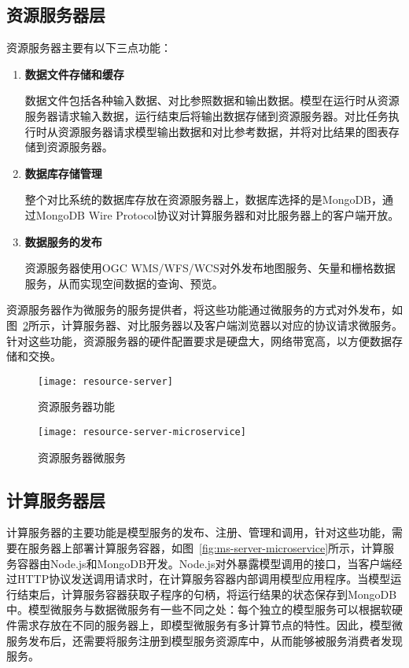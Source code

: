 \subsection{资源服务器层}
资源服务器主要有以下三点功能：
\begin{enumerate}[(1)]
\item \textbf{数据文件存储和缓存}

数据文件包括各种输入数据、对比参照数据和输出数据。模型在运行时从资源服务器请求输入数据，运行结束后将输出数据存储到资源服务器。对比任务执行时从资源服务器请求模型输出数据和对比参考数据，并将对比结果的图表存储到资源服务器。

\item \textbf{数据库存储管理}

整个对比系统的数据库存放在资源服务器上，数据库选择的是MongoDB，通过MongoDB Wire Protocol协议对计算服务器和对比服务器上的客户端开放。

\item \textbf{数据服务的发布}

资源服务器使用OGC WMS/WFS/WCS对外发布地图服务、矢量和栅格数据服务，从而实现空间数据的查询、预览。

\end{enumerate}

资源服务器作为微服务的服务提供者，将这些功能通过微服务的方式对外发布，如图~\ref{fig:resource-server-microservice}所示，计算服务器、对比服务器以及客户端浏览器以对应的协议请求微服务。针对这些功能，资源服务器的硬件配置要求是硬盘大，网络带宽高，以方便数据存储和交换。

\begin{figure}[!htbp]
    \centering
    \texttt{[image: resource-server]}
    \caption{资源服务器功能}
    \label{fig:resource-server}
\end{figure}

\begin{figure}[!htbp]
    \centering
    \texttt{[image: resource-server-microservice]}
    \caption{资源服务器微服务}
    \label{fig:resource-server-microservice}
\end{figure}


\subsection{计算服务器层}
计算服务器的主要功能是模型服务的发布、注册、管理和调用，针对这些功能，需要在服务器上部署计算服务容器，如图~\ref{fig:ms-server-microservice}所示，计算服务容器由Node.js和MongoDB开发。Node.js对外暴露模型调用的接口，当客户端经过HTTP协议发送调用请求时，在计算服务容器内部调用模型应用程序。当模型运行结束后，计算服务容器获取子程序的句柄，将运行结果的状态保存到MongoDB中。模型微服务与数据微服务有一些不同之处：每个独立的模型服务可以根据软硬件需求存放在不同的服务器上，即模型微服务有多计算节点的特性。因此，模型微服务发布后，还需要将服务注册到模型服务资源库中，从而能够被服务消费者发现服务。

